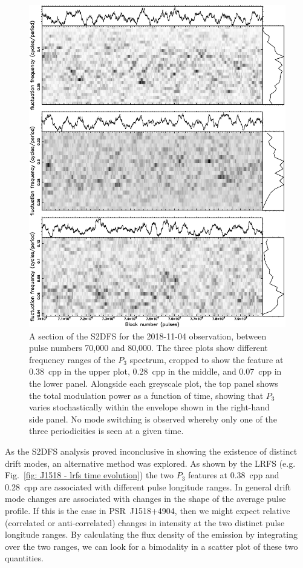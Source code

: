\begin{figure}
    \begin{center}
        \includegraphics[width=1.0\textwidth]{Figures/J1518/S2DFS_256_2.png}
        \caption[The sliding 2DFS]{A section of the S2DFS for the 2018-11-04 observation, between pulse numbers 70,000 and 80,000. The three plots show different frequency ranges of the $P_3$ spectrum, cropped to show the feature at 0.38~cpp in the upper plot, 0.28~cpp in the middle, and 0.07~cpp in the lower panel. Alongside each greyscale plot, the top panel shows the total modulation power as a function of time, showing that $P_3$ varies stochastically within the envelope shown in the right-hand side panel. No mode switching is observed whereby only one of the three periodicities is seen at a given time.}
        \label{fig: J1518 - S2DFS}
    \end{center}
\end{figure}



As the S2DFS analysis proved inconclusive in showing the existence of distinct drift modes, an alternative method was explored. As shown by the LRFS (e.g. Fig.~\ref{fig: J1518 - lrfs time evolution}) the two $P_3$ features at 0.38~cpp and 0.28~cpp are associated with different pulse longitude ranges. In general drift mode changes are associated with changes in the shape of the average pulse profile. If this is the case in PSR~J1518+4904, then we might expect relative (correlated or anti-correlated) changes in intensity at the two distinct pulse longitude ranges. By calculating the flux density of the emission by integrating over the two ranges, we can look for a bimodality in a scatter plot of these two quantities.

